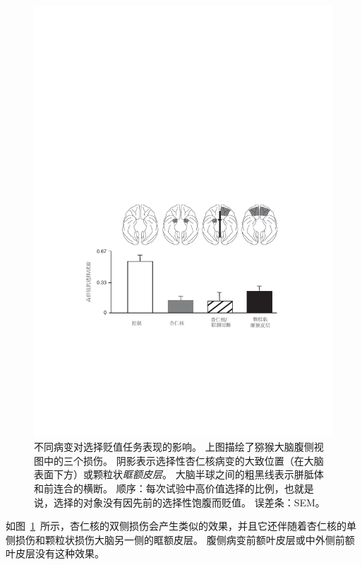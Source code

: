 \begin{figure}[!htb]
	\centering
	\includegraphics{chap4/fig_4_10}
	\caption{不同病变对选择贬值任务表现的影响。
		上图描绘了猕猴大脑腹侧视图中的三个损伤。
		阴影表示选择性杏仁核病变的大致位置（在大脑表面下方）或颗粒状\textit{眶额皮层}。
		大脑半球之间的粗黑线表示胼胝体和前连合的横断。
		顺序：每次试验中高价值选择的比例，也就是说，选择的对象没有因先前的选择性饱腹而贬值。
		误差条：SEM\cite{murray2007orbitofrontal}。}
	\label{fig:fig_4_10}
\end{figure}


如图~\ref{fig:fig_4_10}~所示，杏仁核的双侧损伤会产生类似的效果，并且它还伴随着杏仁核的单侧损伤和颗粒状损伤大脑另一侧的眶额皮层\cite{baxter2000control}。
腹侧病变前额叶皮层或中外侧前额叶皮层没有这种效果\cite{baxter2009ventrolateral}。\par



